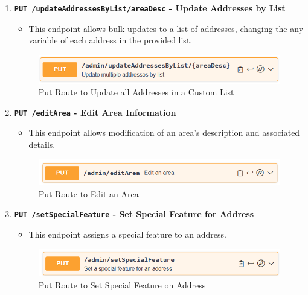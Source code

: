 \begin{enumerate}
        \item \textbf{\texttt{PUT /updateAddressesByList/{areaDesc}} - Update Addresses by List}
        \begin{itemize}
            \item This endpoint allows bulk updates to a list of addresses, changing the any variable of each address in the provided list.
        \end{itemize} 
        \begin{figure} [H]
            \centering
            \includegraphics [width=1\textwidth] {images/andreas/praxis/updateAddressByList.png}
            \caption{Put Route to Update all Addresses in a Custom List}
        \end{figure}

        \item \textbf{\texttt{PUT /editArea} - Edit Area Information}
        \begin{itemize}
            \item This endpoint allows modification of an area’s description and associated details.
        \end{itemize} 
        \begin{figure} [H]
            \centering
            \includegraphics [width=1\textwidth] {images/andreas/praxis/editArea.png}
            \caption{Put Route to Edit an Area}
        \end{figure}

        \item \textbf{\texttt{PUT /setSpecialFeature} - Set Special Feature for Address}
        \begin{itemize}
            \item This endpoint assigns a special feature to an address.
        \end{itemize} 
        \begin{figure} [H]
            \centering
            \includegraphics [width=1\textwidth] {images/andreas/praxis/setSFOfAddress.png}
            \caption{Put Route to Set Special Feature on Address}
        \end{figure}


\end{enumerate}
